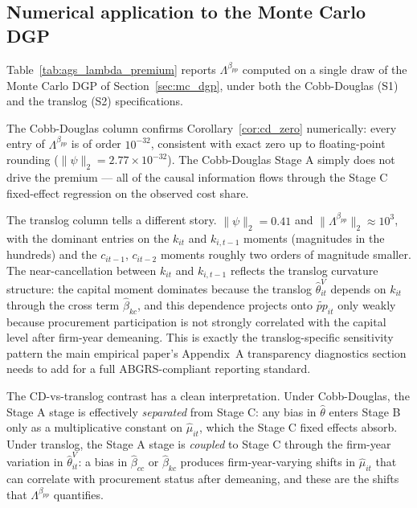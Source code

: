 \documentclass[11pt]{article}
\begin{document}
\subsection{Numerical application to the Monte Carlo DGP}\label{sec:ags_numerical}

Table~\ref{tab:ags_lambda_premium} reports $\Lambda^{\beta_{pp}}$ computed on a single draw of the Monte Carlo DGP of Section~\ref{sec:mc_dgp}, under both the Cobb-Douglas (S1) and the translog (S2) specifications.

\begin{table}[htbp]
\centering
\caption{Composite AGS sensitivity of the procurement premium $\hat\beta_{pp}$ to each Stage A moment}
\label{tab:ags_lambda_premium}
\small

\end{table}

The Cobb-Douglas column confirms Corollary~\ref{cor:cd_zero} numerically: every entry of $\Lambda^{\beta_{pp}}$ is of order $10^{-32}$, consistent with exact zero up to floating-point rounding ($\|\psi\|_2 = 2.77\times 10^{-32}$). The Cobb-Douglas Stage A simply does not drive the premium --- all of the causal information flows through the Stage C fixed-effect regression on the observed cost share.

The translog column tells a different story. $\|\psi\|_2 = 0.41$ and $\|\Lambda^{\beta_{pp}}\|_2 \approx 10^3$, with the dominant entries on the $k_{it}$ and $k_{i,t-1}$ moments (magnitudes in the hundreds) and the $c_{it-1}$, $c_{it-2}$ moments roughly two orders of magnitude smaller. The near-cancellation between $k_{it}$ and $k_{i,t-1}$ reflects the translog curvature structure: the capital moment dominates because the translog $\hat\theta^V_{it}$ depends on $k_{it}$ through the cross term $\hat\beta_{kc}$, and this dependence projects onto $\widetilde{pp}_{it}$ only weakly because procurement participation is not strongly correlated with the capital level after firm-year demeaning. This is exactly the translog-specific sensitivity pattern the main empirical paper's Appendix~A transparency diagnostics section needs to add for a full ABGRS-compliant reporting standard.

The CD-vs-translog contrast has a clean interpretation. Under Cobb-Douglas, the Stage A stage is effectively \emph{separated} from Stage C: any bias in $\hat\theta$ enters Stage B only as a multiplicative constant on $\hat\mu_{it}$, which the Stage C fixed effects absorb. Under translog, the Stage A stage is \emph{coupled} to Stage C through the firm-year variation in $\hat\theta^V_{it}$: a bias in $\hat\beta_{cc}$ or $\hat\beta_{kc}$ produces firm-year-varying shifts in $\hat\mu_{it}$ that can correlate with procurement status after demeaning, and these are the shifts that $\Lambda^{\beta_{pp}}$ quantifies.
\end{document}
